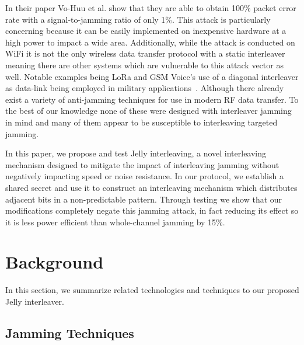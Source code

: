 \documentclass[sigconf, anonymous]{acmart}
\begin{document}
In their paper Vo-Huu et al. show that they are able to obtain 100\% packet error rate with a signal-to-jamming ratio of only 1\%. This attack is particularly concerning because it can be easily implemented on inexpensive hardware at a high power to impact a wide area. Additionally, while the attack is conducted on WiFi it is not the only wireless data transfer protocol with a static interleaver meaning there are other systems which are vulnerable to this attack vector as well. Notable examples being LoRa and GSM Voice's use of a diagonal interleaver as data-link being employed in military applications~\cite{knight2016decoding}. Although there already exist a variety of anti-jamming techniques for use in modern RF data transfer. To the best of our knowledge none of these were designed with interleaver jamming in mind and many of them appear to be susceptible to interleaving targeted jamming. 

In this paper, we propose and test Jelly interleaving, a novel interleaving mechanism designed to mitigate the impact of interleaving jamming without negatively impacting speed or noise resistance. In our protocol, we establish a shared secret and use it to construct an interleaving mechanism which distributes adjacent bits in a non-predictable pattern. Through testing we show that our modifications completely negate this jamming attack, in fact reducing its effect so it is less power efficient than whole-channel jamming by 15\%.


\section{Background}
\label{sec:background}

In this section, we summarize related technologies and techniques to our proposed Jelly interleaver.

\subsection{Jamming Techniques}
\label{sec:jamming}
\end{document}
